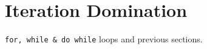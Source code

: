 \section{Iteration Domination}
\begin{topics}
\verb!for, while & do while! loops and previous sections.
\end{topics}




